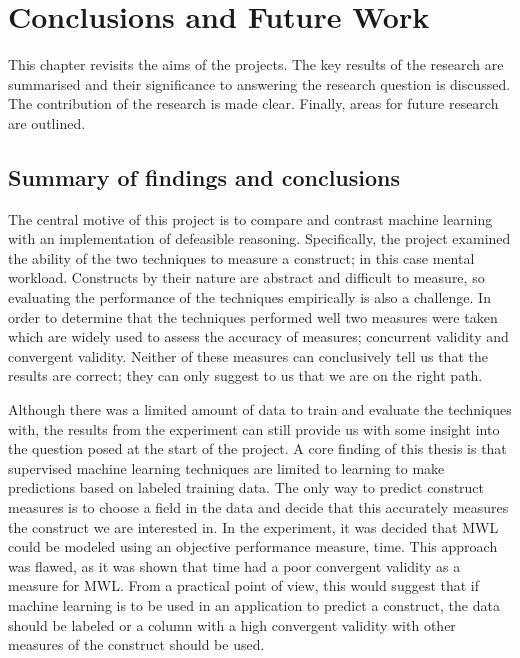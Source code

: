
\chapter{Conclusions and Future Work} %

\label{Chapter6} 


This chapter revisits the aims of the projects. The key results of the research are summarised and their significance to answering the research question is discussed. The contribution of the research is made clear. Finally, areas for future research are outlined.

\section{Summary of findings and conclusions}

The central motive of this project is to compare and contrast machine learning with an implementation of defeasible reasoning. Specifically, the project examined the ability of the two techniques to measure a construct; in this case mental workload. Constructs by their nature are abstract and difficult to measure, so evaluating the performance of the techniques empirically is also a challenge. In order to determine that the techniques performed well two measures were taken which are widely used to assess the accuracy of measures; concurrent validity and convergent validity. Neither of these measures can conclusively tell us that the results are correct; they can only suggest to us that we are on the right path.

Although there was a limited amount of data to train and evaluate the techniques with, the results from the experiment can still provide us with some insight into the question posed at the start of the project. A core finding of this thesis is that supervised machine learning techniques are limited to learning to make predictions based on labeled training data. The only way to predict construct measures is to choose a field in the data and decide that this accurately measures the construct we are interested in. In the experiment, it was decided that MWL could be modeled using an objective performance measure, time. This approach was flawed, as it was shown that time had a poor convergent validity as a measure for MWL. From a practical point of view, this would suggest that if machine learning is to be used in an application to predict a construct, the data should be labeled or a column with a high convergent validity with other measures of the construct should be used. 

